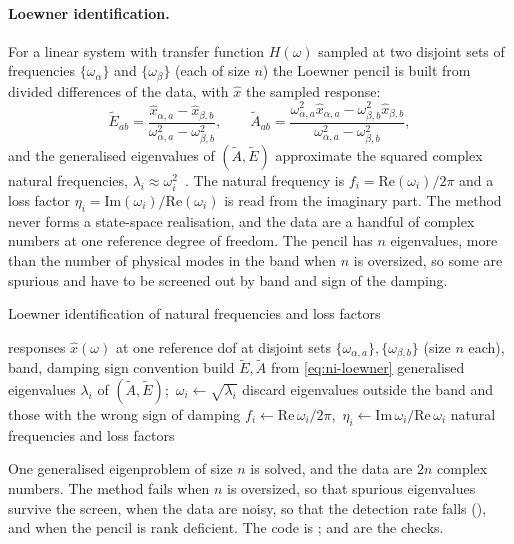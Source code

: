 \paragraph{Loewner identification.}
For a linear system with transfer function $H(\omega)$ sampled at two disjoint sets of frequencies $\{\omega_\alpha\}$ and $\{\omega_\beta\}$ (each of size $n$) the Loewner pencil is built from divided differences of the data, with $\hat x$ the sampled response:
\begin{equation}\label{eq:ni-loewner}
\tilde E_{ab}=\frac{\hat x_{\alpha,a}-\hat x_{\beta,b}}{\omega_{\alpha,a}^2-\omega_{\beta,b}^2},\qquad
\tilde A_{ab}=\frac{\omega_{\alpha,a}^2\hat x_{\alpha,a}-\omega_{\beta,b}^2\hat x_{\beta,b}}{\omega_{\alpha,a}^2-\omega_{\beta,b}^2},
\end{equation}
and the generalised eigenvalues of $(\tilde A,\tilde E)$ approximate the squared complex natural frequencies, $\lambda_i\approx\omega_i^2$~\cite{mayo2007loewner,liu2026fsi}. The natural frequency is $f_i=\mathrm{Re}(\omega_i)/2\pi$ and a loss factor $\eta_i=\mathrm{Im}(\omega_i)/\mathrm{Re}(\omega_i)$ is read from the imaginary part. The method never forms a state-space realisation, and the data are a handful of complex numbers at one reference degree of freedom. The pencil has $n$ eigenvalues, more than the number of physical modes in the band when $n$ is oversized, so some are spurious and have to be screened out by band and sign of the damping.

\begin{algbox}{Loewner identification of natural frequencies and loss factors}
\begin{pseudo}
\Require responses $\hat x(\omega)$ at one reference dof at disjoint sets $\{\omega_{\alpha,a}\},\{\omega_{\beta,b}\}$ (size $n$ each), band, damping sign convention
\State build $\tilde E,\tilde A$ from \eqref{eq:ni-loewner}
\State generalised eigenvalues $\lambda_i$ of $(\tilde A,\tilde E)$;\ $\omega_i\gets\sqrt{\lambda_i}$
\State discard eigenvalues outside the band and those with the wrong sign of damping 
\State $f_i\gets\mathrm{Re}\,\omega_i/2\pi$,\ $\eta_i\gets\mathrm{Im}\,\omega_i/\mathrm{Re}\,\omega_i$
\Ensure natural frequencies and loss factors
\end{pseudo}
\end{algbox}

One generalised eigenproblem of size $n$ is solved, and the data are $2n$ complex numbers. The method fails when $n$ is oversized, so that spurious eigenvalues survive the screen, when the data are noisy, so that the detection rate falls (), and when the pencil is rank deficient. The code is ;  and  are the checks.

